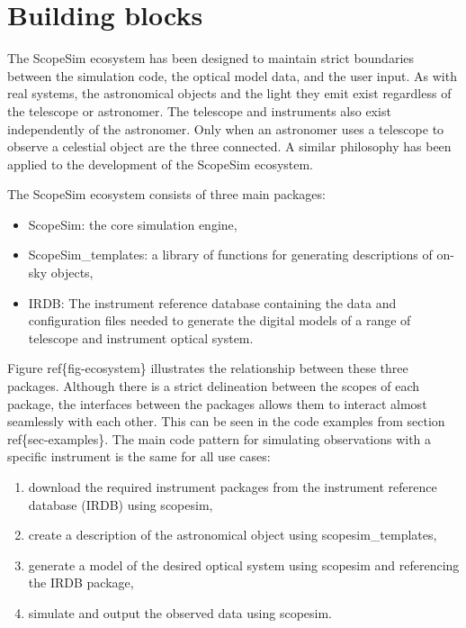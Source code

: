 

\section{Building blocks%
  \label{building-blocks}%
}

\begin{figure}[H]
\noindent{}\label{fig-ecosystem}
\end{figure}

The ScopeSim ecosystem has been designed to maintain strict boundaries between the simulation code, the optical model data, and the user input.
As with real systems, the astronomical objects and the light they emit exist regardless of the telescope or astronomer.
The telescope and instruments also exist independently of the astronomer.
Only when an astronomer uses a telescope to observe a celestial object are the three connected.
A similar philosophy has been applied to the development of the ScopeSim ecosystem.

The ScopeSim ecosystem consists of three main packages:

\begin{itemize}
\item ScopeSim: the core simulation engine,

\item ScopeSim\_templates: a library of functions for generating descriptions of on-sky objects,

\item IRDB: The instrument reference database containing the data and configuration files needed to generate the digital models of a range of telescope and instrument optical system.
\end{itemize}

Figure ref\{fig-ecosystem\} illustrates the relationship between these three packages.
Although there is a strict delineation between the scopes of each package, the interfaces between the packages allows them to interact almost seamlessly with each other.
This can be seen in the code examples from section ref\{sec-examples\}.
The main code pattern for simulating observations with a specific instrument is the same for all use cases:

\begin{enumerate}
\item download the required instrument packages from the instrument reference database (IRDB) using scopesim,

\item create a description of the astronomical object using scopesim\_templates,

\item generate a model of the desired optical system using scopesim and referencing the IRDB package,

\item simulate and output the observed data using scopesim.
\end{enumerate}

